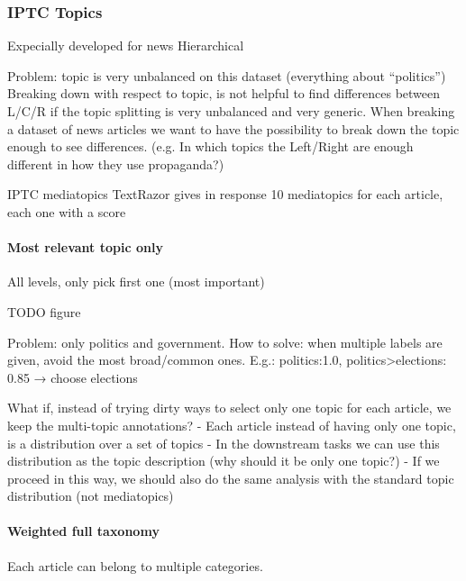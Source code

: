 \subsubsection{IPTC Topics}

Expecially developed for news
Hierarchical


Problem: topic is very unbalanced on this dataset (everything about “politics”)
Breaking down with respect to topic, is not helpful to find differences between L/C/R if the topic splitting is very unbalanced and very generic.
When breaking a dataset of news articles we want to have the possibility to break down the topic enough to see differences. (e.g. In which topics the Left/Right are enough different in how they use propaganda?)



IPTC mediatopics
TextRazor gives in response 10 mediatopics for each article, each one with a score

\paragraph{Most relevant topic only}
All levels, only pick first one (most important)

TODO figure


Problem: only politics and government.
How to solve: when multiple labels are given, avoid the most broad/common ones. E.g.: politics:1.0, politics>elections: 0.85 → choose elections

What if, instead of trying dirty ways to select only one topic for each article, we keep the multi-topic annotations?
- Each article instead of having only one topic, is a distribution over a set of topics
- In the downstream tasks we can use this distribution as the topic description (why should it be only one topic?)
- If we proceed in this way, we should also do the same analysis with the standard topic distribution (not mediatopics)


\paragraph{Weighted full taxonomy}
Each article can belong to multiple categories.

